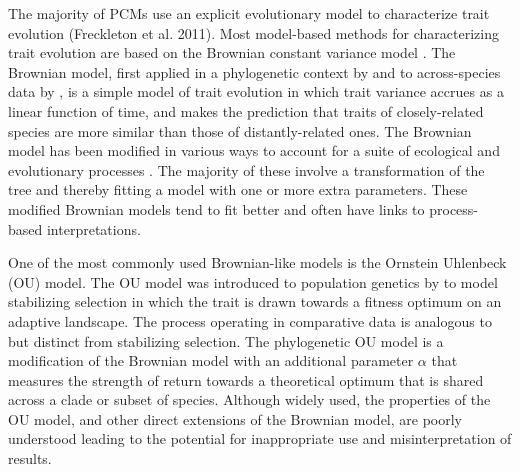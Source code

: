 \documentclass[a4paper,12pt]{article}
\begin{document}
  The majority of PCMs use an explicit evolutionary model to characterize trait evolution (Freckleton et al. 2011). Most model-based methods for characterizing trait evolution are based on the Brownian constant variance model \citep[for exceptions see][]{price1997correlated,harvey2000comparative,freckleton2006detecting}. 
  The Brownian model, first applied in a phylogenetic context by \citet{cavalli1967} and to across-species data by \citet{felsenstein1973maximum}, is a simple model of trait evolution in which trait variance accrues as a linear function of time, and makes the prediction that traits of closely-related species are more similar than those of distantly-related ones. 
  The Brownian model has been modified in various ways to account for a suite of ecological and evolutionary processes \citep[e.g.,][]{grafen1989phylogenetic,hansen1997stabilizing,Pagel:1997aa,Pagel:1999aa}. 
  The majority of these involve a transformation of the tree and thereby fitting a model with one or more extra parameters. 
  These modified Brownian models tend to fit better and often have links to process-based interpretations. 

  One of the most commonly used Brownian-like models is the Ornstein Uhlenbeck (OU) model. 
  The OU model was introduced to population genetics by \cite{Lande:1976aa} to model stabilizing selection in which the trait is drawn towards a fitness optimum on an adaptive landscape. 
  The process operating in comparative data is analogous to but distinct from stabilizing selection. The phylogenetic OU model is a modification of the Brownian model with an additional parameter $\alpha$ that measures the strength of return towards a theoretical optimum \citep{hansen1997stabilizing} that is shared across a clade or subset of species.
  Although widely used, the properties of the OU model, and other direct extensions of the Brownian model, are poorly understood leading to the potential for inappropriate use and misinterpretation of results.
\end{document}
